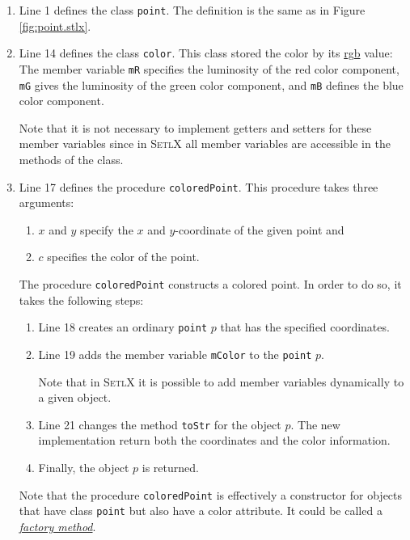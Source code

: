 \begin{enumerate}
\item Line 1 defines the class \texttt{point}.  The definition is the same as in Figure
     \ref{fig:point.stlx}.
\item Line 14 defines the class \texttt{color}.  This class stored the color by its 
      \href{http://en.wikipedia.org/wiki/RGB_color_model}{rgb} value: The member variable
      \texttt{mR} specifies the luminosity of the red color component, \texttt{mG} gives the 
      luminosity of the green color component, and \texttt{mB} defines the blue color component.

      Note that it is not necessary to implement getters and setters for these member variables since
      in \textsc{SetlX} all member variables are accessible in the methods of the class.
\item Line 17 defines the procedure \texttt{coloredPoint}.  This procedure takes three arguments:
      \begin{enumerate}
      \item $x$ and $y$ specify the $x$ and $y$-coordinate of the given point and
      \item $c$ specifies the color of the point.
      \end{enumerate}
      The procedure \texttt{coloredPoint} constructs a colored point.  In order to do so, it takes 
      the following steps:
      \begin{enumerate}
      \item Line 18 creates an ordinary \texttt{point} $p$ that has the specified coordinates.
      \item Line 19 adds the member variable \texttt{mColor} to the \texttt{point} $p$.

            Note that in \textsc{SetlX} it is possible to add member variables dynamically to a given object.
      \item Line 21 changes the method \texttt{toStr} for the object $p$.  The new implementation
            return both the coordinates and the color information.
      \item Finally, the object $p$ is returned.
      \end{enumerate}
      Note that the procedure \texttt{coloredPoint} is effectively a constructor for objects
      that have class \texttt{point} but also have a color attribute.  It could be called a
      \href{http://en.wikipedia.org/wiki/Factory_method_pattern}{\emph{factory method}}.
\end{enumerate}



